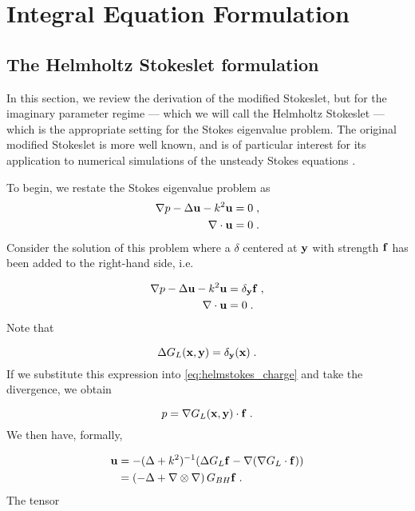 \documentclass[preprint,12pt]{article}
\def\xx{{\bf x}}
\def\yy{{\bf y}}
\def\uu{{\bf u}}
\def\ff{{\bf f}}
\begin{document}
\section{Integral Equation Formulation}

\subsection{The Helmholtz Stokeslet formulation}

In this section, we review the derivation of the
modified Stokeslet, but for the imaginary parameter
regime --- which we will call the Helmholtz Stokeslet ---
which is the appropriate setting for the Stokes
eigenvalue problem.
The original modified Stokeslet is more well known,
and is of particular interest for its application to
numerical simulations of the unsteady Stokes equations
\cite{pozrikidis1992boundary,biros2002embedded}.

To begin, we restate the Stokes eigenvalue
problem as
\begin{align}
  \nabla p - \Delta \uu - k^2 \uu &= 0 \; , \label{eq:helmstokes}\\
  \nabla \cdot \uu &= 0 \; . \label{eq:helmstokescty}
\end{align}
Consider the solution of this problem where a
$\delta$ centered at $\yy$ with strength $\ff$
has been added to the right-hand side, i.e.

\begin{align}
  \nabla p - \Delta \uu - k^2 \uu &= \delta_\yy \ff \; ,
  \label{eq:helmstokes_charge} \\
  \nabla \cdot \uu &= 0 \; .
\end{align}
Note that

\begin{equation}
  \Delta G_L(\xx,\yy) = \delta_\yy(\xx) \; .
\end{equation}
If we substitute this expression into
\eqref{eq:helmstokes_charge} and take the divergence,
we obtain

\begin{equation}
  p = \nabla G_L(\xx,\yy) \cdot \ff \; .
\end{equation}
We then have, formally,

\begin{align}
  \uu &= - (\Delta + k^2)^{-1} ( \Delta G_L \ff
  - \nabla (\nabla G_L \cdot \ff ) ) \\
  &= \left ( -\Delta + \nabla \otimes \nabla \right )
  G_{BH} \ff \; .
\end{align}
The tensor
\end{document}

